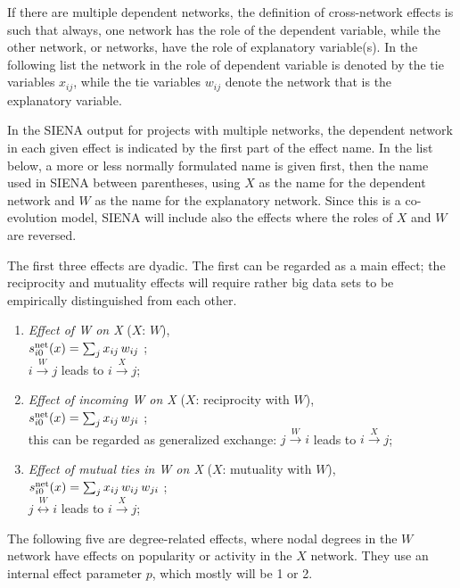 \documentclass[a4paper,fleqn]{article}
\newcommand{\+}{\, + \,}
\newcommand{\vit}{\theenumi}
\newcommand{\SI}{{\sf SIENA }}
\newcounter{savenumi}
\begin{document}
{If there are multiple dependent networks, the definition of
cross-network effects is such that always, one network has the
role of the dependent variable, while the other network, or
networks, have the role of explanatory variable(s).
In the following list the network in the role of dependent variable
is denoted by the tie variables $x_{ij}$, while the
tie variables $w_{ij}$ denote the network that is the
explanatory variable.

In the \SI output for projects with multiple networks,
the dependent network in each given effect is indicated by
the first part of the effect name.
In the list below, a more or less normally formulated name is given first, then the
name used in \SI between parentheses,
using $X$ as the name for the dependent network and $W$
as the name for the explanatory network.
Since this is a co-evolution model, \SI will include also the effects
where the roles of $X$ and $W$ are reversed.

The first three effects are dyadic. The first can be regarded
as a main effect; the reciprocity and mutuality effects
will require rather big data sets to be empirically distinguished
from each other.
\begin{enumerate}
 \item {\em Effect of W on X} ($X$: $W$),\\
 $s^{\rm net}_{i\vit}(x) = \sum_j x_{ij} \, w_{ij}  $ ;\\
 $i \stackrel{W}{\rightarrow} j$ leads to  $i \stackrel{X}{\rightarrow} j$;

 \item {\em Effect of incoming W on X} ($X$: reciprocity with $W$),\\
 $s^{\rm net}_{i\vit}(x) = \sum_j x_{ij} \, w_{ji}  $ ;\\
 this can be regarded as generalized exchange:
 $j \stackrel{W}{\rightarrow} i$ leads to  $i \stackrel{X}{\rightarrow} j$;

 \item {\em Effect of mutual ties in W on X} ($X$: mutuality with $W$),\\
 $s^{\rm net}_{i\vit}(x) = \sum_j x_{ij} \, w_{ij} \, w_{ji}  $ ;\\
 $j \stackrel{W}{\leftrightarrow} i$ leads to  $i \stackrel{X}{\rightarrow} j$;
\setcounter{savenumi}{\value{enumi}}
\end{enumerate}
\smallskip
The following five are degree-related effects, where nodal degrees
in the $W$ network have effects on popularity or activity in the
$X$  network. They use an internal effect parameter $p$, which
mostly will be 1 or 2.

}
\end{document}
